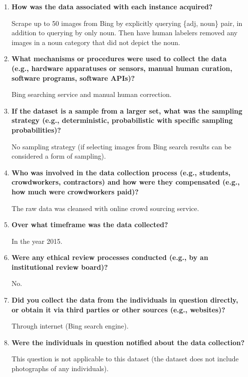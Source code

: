 \documentclass[a4paper,12pt]{article}
\begin{document}
\begin{enumerate}
    \item \textbf{How was the data associated with each instance acquired? }
    
    Scrape up to 50 images from Bing by explicitly querying \{adj, noun\} pair, in addition to querying by only noun. Then have human labelers removed any images in a noun category that did not depict the noun.

    \item \textbf{What mechanisms or procedures were used to collect the data
    (e.g., hardware apparatuses or sensors, manual human curation,
    software programs, software APIs)?}

    Bing searching service and manual human correction.

    \item \textbf{If the dataset is a sample from a larger set, what was the sampling
    strategy (e.g., deterministic, probabilistic with specific sampling
    probabilities)?}

    No sampling strategy (if selecting images from Bing search results can be considered a form of sampling).

    \item \textbf{Who was involved in the data collection process (e.g., students,
    crowdworkers, contractors) and how were they compensated (e.g.,
    how much were crowdworkers paid)?}

    The raw data was cleansed with online crowd sourcing service.

    \item \textbf{Over what timeframe was the data collected?}

    In the year 2015.

    
    \item \textbf{Were any ethical review processes conducted (e.g., by an institutional review board)?}
    
    No.

    \item \textbf{Did you collect the data from the individuals in question directly,
    or obtain it via third parties or other sources (e.g., websites)?}

    Through internet (Bing search engine).

    \item \textbf{Were the individuals in question notified about the data collection?}
    
    This question is not applicable to this dataset (the dataset does not include photographs of any individuals).


\end{enumerate}
\end{document}
